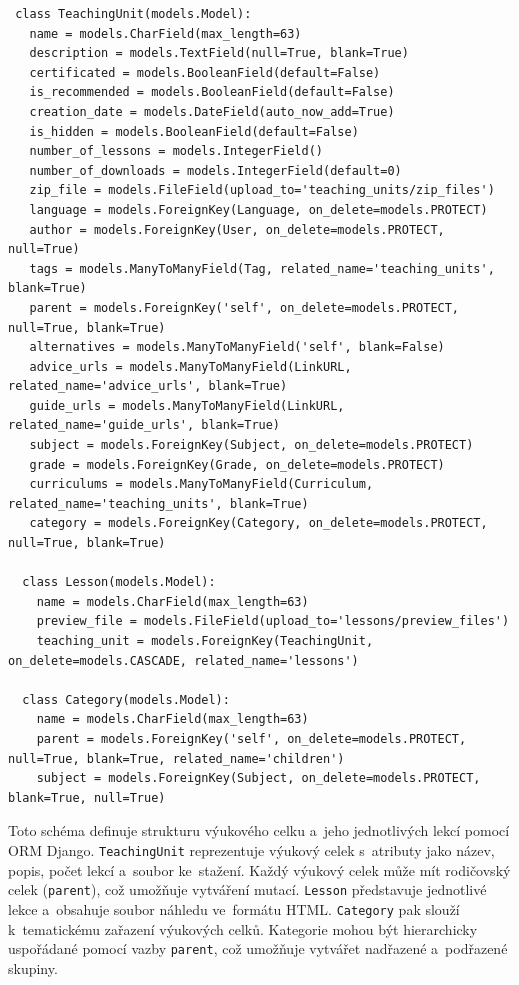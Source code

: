 \documentclass[male,czech,api_bc]{kitheses}
\begin{document}
\begin{lstlisting}
 class TeachingUnit(models.Model):
   name = models.CharField(max_length=63)
   description = models.TextField(null=True, blank=True)
   certificated = models.BooleanField(default=False)
   is_recommended = models.BooleanField(default=False)
   creation_date = models.DateField(auto_now_add=True)
   is_hidden = models.BooleanField(default=False)
   number_of_lessons = models.IntegerField()
   number_of_downloads = models.IntegerField(default=0)
   zip_file = models.FileField(upload_to='teaching_units/zip_files')
   language = models.ForeignKey(Language, on_delete=models.PROTECT)
   author = models.ForeignKey(User, on_delete=models.PROTECT, null=True)
   tags = models.ManyToManyField(Tag, related_name='teaching_units', blank=True)
   parent = models.ForeignKey('self', on_delete=models.PROTECT, null=True, blank=True)
   alternatives = models.ManyToManyField('self', blank=False)
   advice_urls = models.ManyToManyField(LinkURL, related_name='advice_urls', blank=True)
   guide_urls = models.ManyToManyField(LinkURL, related_name='guide_urls', blank=True)
   subject = models.ForeignKey(Subject, on_delete=models.PROTECT)
   grade = models.ForeignKey(Grade, on_delete=models.PROTECT)
   curriculums = models.ManyToManyField(Curriculum, related_name='teaching_units', blank=True)
   category = models.ForeignKey(Category, on_delete=models.PROTECT, null=True, blank=True)
	
  class Lesson(models.Model):
    name = models.CharField(max_length=63)
    preview_file = models.FileField(upload_to='lessons/preview_files')
    teaching_unit = models.ForeignKey(TeachingUnit, on_delete=models.CASCADE, related_name='lessons')
	
  class Category(models.Model):
    name = models.CharField(max_length=63)
    parent = models.ForeignKey('self', on_delete=models.PROTECT, null=True, blank=True, related_name='children')
    subject = models.ForeignKey(Subject, on_delete=models.PROTECT, blank=True, null=True)
\end{lstlisting}

Toto schéma definuje strukturu výukového celku a~jeho jednotlivých lekcí pomocí ORM Django. \texttt{TeachingUnit} reprezentuje výukový celek s~atributy jako název, popis, počet lekcí a~soubor ke~stažení. Každý výukový celek může mít rodičovský celek (\texttt{parent}), což umožňuje vytváření mutací. \texttt{Lesson} představuje jednotlivé lekce a~obsahuje soubor náhledu ve~formátu HTML. \texttt{Category} pak slouží k~tematickému zařazení výukových celků. Kategorie mohou být hierarchicky uspořádané pomocí vazby \texttt{parent}, což umožňuje vytvářet nadřazené a~podřazené skupiny.
\end{document}
